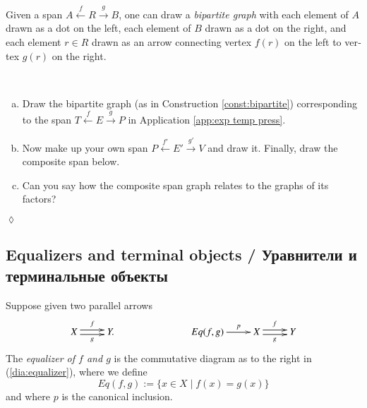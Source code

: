 \documentclass{book}
\def\|{{\;|\;}}
\newcommand{\To}[1]{\xrightarrow{#1}}
\newcommand{\From}[1]{\xleftarrow{#1}}
\theoremstyle{theoremENG}
\theoremstyle{lemmaENG}
\theoremstyle{propositionENG}
\theoremstyle{corollaryENG}
\theoremstyle{factENG}
\theoremstyle{remarkENG}
\theoremstyle{exampleENG}
\theoremstyle{warningENG}
\theoremstyle{questionENG}
\theoremstyle{guessENG}
\theoremstyle{answerENG}
\theoremstyle{constructionENG}
\newtheorem{constructionENG}[subsubsection]{\begin{english}Construction\end{english}}
\theoremstyle{rulesENG}
\theoremstyle{excENG}
\newtheorem{excENG}[subsubsection]{\begin{english}Exercise\end{english}}
\theoremstyle{appENG}
\theoremstyle{definitionENG}
\newtheorem{definitionENG}[subsubsection]{\begin{english}Definition\end{english}}
\theoremstyle{notationENG}
\theoremstyle{conjectureENG}
\theoremstyle{postulateENG}
\newenvironment{exerciseENG}{\begin{excENG}}{\hspace*{\fill}$\lozenge$\end{excENG}}
\theoremstyle{theoremRUS}
\theoremstyle{lemmaRUS}
\theoremstyle{propositionRUS}
\theoremstyle{corollaryRUS}
\theoremstyle{factRUS}
\theoremstyle{remarkRUS}
\theoremstyle{exampleRUS}
\theoremstyle{warningRUS}
\theoremstyle{questionRUS}
\theoremstyle{guessRUS}
\theoremstyle{answerRUS}
\theoremstyle{constructionRUS}
\theoremstyle{rulesRUS}
\theoremstyle{excRUS}
\theoremstyle{appRUS}
\theoremstyle{definitionRUS}
\theoremstyle{notationRUS}
\theoremstyle{conjectureRUS}
\theoremstyle{postulateRUS}
\def\sexc{\begin{enumerate}[a.)]\setlength{\itemsep}{.1cm}\setlength{\parskip}{.1cm}\item}
\def\next{\item}
\def\endsexc{\end{enumerate}}
\begin{document}
\begin{english}
\begin{russian} \end{russian}

\begin{constructionENG}\label{const:bipartite}

Given a span $A\From{f} R\To{g} B$, one can draw a {\em bipartite graph} with each element of $A$ drawn as a dot on the left, each element of $B$ drawn as a dot on the right, and each element $r\in R$ drawn as an arrow connecting vertex $f(r)$ on the left to vertex $g(r)$ on the right.

\begin{russian} \end{russian}

\end{constructionENG}

\begin{exerciseENG}~

\sexc Draw the bipartite graph (as in Construction \ref{const:bipartite}) corresponding to the span $T\From{f}E\To{g}P$ in Application \ref{app:exp temp press}.
\next Now make up your own span $P\From{f'}E'\To{g'}V$ and draw it. Finally, draw the composite span below. 
\next Can you say how the composite span graph relates to the graphs of its factors?
\endsexc

\begin{russian} \end{russian}

\end{exerciseENG}


\subsection{Equalizers and terminal objects / Уравнители и терминальные объекты}

\begin{definitionENG}\label{def:equalizer}

Suppose given two parallel arrows 
\begin{align}\label{dia:equalizer}
\xymatrix{X\ar@<.5ex>[r]^f\ar@<-.5ex>[r]_g&Y.}\hspace{1in}\xymatrix{Eq(f,g)\ar[r]^-p&X\ar@<.5ex>[r]^f\ar@<-.5ex>[r]_g&Y}
\end{align}
The {\em equalizer of $f$ and $g$} is the commutative diagram as to the right in (\ref{dia:equalizer}), where we define $$Eq(f,g):=\{x\in X\|f(x)=g(x)\}$$ and where $p$ is the canonical inclusion.


\end{definitionENG}
\end{english}
\end{document}

